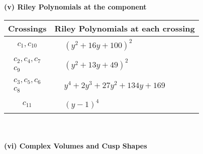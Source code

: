 \documentclass[1p]{elsarticle_modified}
\theoremstyle{definition}
\begin{document}
\newpage\renewcommand{\arraystretch}{1}
\flushleft \textbf{(v) Riley Polynomials at the component}\newline \\
\begin{tabular}{m{50pt}|m{274pt}}
Crossings & \hspace{64pt}Riley Polynomials at each crossing \\
\hline $$\begin{aligned}c_{1},c_{10}\end{aligned}$$&$\begin{aligned}
&(y^2+16 y+100)^2
\end{aligned}$\\
\hline $$\begin{aligned}c_{2},c_{4},c_{7}\\c_{9}\end{aligned}$$&$\begin{aligned}
&(y^2+13 y+49)^2
\end{aligned}$\\
\hline $$\begin{aligned}c_{3},c_{5},c_{6}\\c_{8}\end{aligned}$$&$\begin{aligned}
&y^4+2 y^3+27 y^2+134 y+169
\end{aligned}$\\
\hline $$\begin{aligned}c_{11}\end{aligned}$$&$\begin{aligned}
&(y-1)^4
\end{aligned}$\\
\hline
\end{tabular}\\~\\
\newpage\flushleft \textbf{(vi) Complex Volumes and Cusp Shapes}
\end{document}
